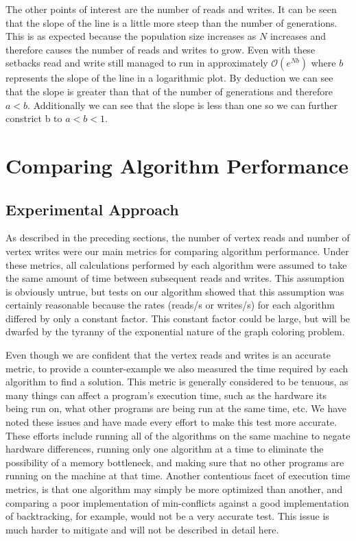 \documentclass{article}
\begin{document}
	The other points of interest are the number of reads and writes. It can be seen that the slope of the line is a little more steep than the number of generations. This is as expected because the population size increases as $N$ increases and therefore causes the number of reads and writes to grow. Even with these setbacks read and write still managed to run in approximately  $\mathcal{O} (e^{Nb})$ where $b$ represents the slope of the line in a logarithmic plot. By deduction we can see that the slope is greater than that of the number of generations and therefore $a<b$. Additionally we can see that the slope is less than one so we can further constrict b to $a<b<1$. 
\section{Comparing Algorithm Performance}
	\label{comparisons}
	
	\subsection{Experimental Approach}
	
	As described in the preceding sections, the number of vertex reads and number of vertex writes were our main metrics for comparing algorithm performance. Under these metrics, all calculations performed by each algorithm were assumed to take the same amount of time between subsequent reads and writes. This assumption is obviously untrue, but tests on our algorithm showed that this assumption was certainly reasonable because the rates (reads/s or writes/s) for each algorithm differed by only a constant factor. This constant factor could be large, but will be dwarfed by the tyranny of the exponential nature of the graph coloring problem.
	
	Even though we are confident that the vertex reads and writes is an accurate metric, to provide a counter-example we also measured the time required by each algorithm to find a solution. This metric is generally considered to be tenuous, as many things can affect a program's execution time, such as the hardware its being run on, what other programs are being run at the same time, etc. We have noted these issues and have made every effort to make this test more accurate. These efforts include running all of the algorithms on the same machine to negate hardware differences, running only one algorithm at a time to eliminate the possibility of a memory bottleneck, and making sure that no other programs are running on the machine at that time. Another contentious facet of execution time metrics, is that one algorithm may simply be more optimized than another, and comparing a poor implementation of min-conflicts against a good implementation of backtracking, for example, would not be a very accurate test. This issue is much harder to mitigate and will not be described in detail here.
\end{document}
